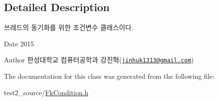 \subsection{Detailed Description}
쓰레드의 동기화를 위한 조건변수 클래스이다. 

\begin{DoxyDate}{Date}
2015 
\end{DoxyDate}
\begin{DoxyAuthor}{Author}
한성대학교 컴퓨터공학과 강진혁(\href{mailto:jinhuk1313@gmail.com}{\tt jinhuk1313@gmail.\+com}) 
\end{DoxyAuthor}


The documentation for this class was generated from the following file\+:\begin{DoxyCompactItemize}
\item 
test2\+\_\+source/\hyperlink{_fk_condition_8h}{Fk\+Condition.\+h}\end{DoxyCompactItemize}
